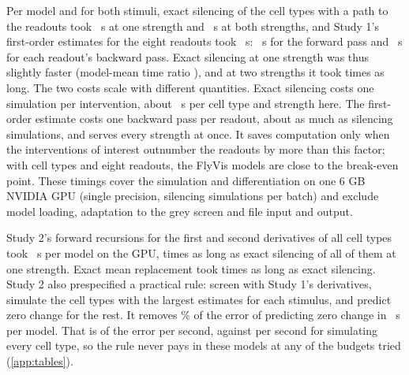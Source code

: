 Per model and for both stimuli, exact silencing of the \SimulatedTypes{} cell types with a path to the readouts took \TimeExactFull{}~s at one strength and \TimeExactBoth{}~s at both strengths, and Study 1's first-order estimates for the eight readouts took \TimeGradient{}~s: \TimeForward{}~s for the forward pass and \TimeBackwardEach{}~s for each readout's backward pass. Exact silencing at one strength was thus slightly faster (model-mean time ratio \TimeRatioFull{}), and at two strengths it took \TimeRatioBoth{} times as long. The two costs scale with different quantities. Exact silencing costs one simulation per intervention, about \TimePerType{}~s per cell type and strength here. The first-order estimate costs one backward pass per readout, about as much as \BackwardOverType{} silencing simulations, and serves every strength at once. It saves computation only when the interventions of interest outnumber the readouts by more than this factor; with \SimulatedTypes{} cell types and eight readouts, the FlyVis models are close to the break-even point. These timings cover the simulation and differentiation on one 6 GB NVIDIA GPU (single precision, \BatchSize{} silencing simulations per batch) and exclude model loading, adaptation to the grey screen and file input and output.

Study 2's forward recursions for the first and second derivatives of all \NSimTypes{} cell types took \TimeTangentsZero{}~s per model on the GPU, \TimeRatioTangents{} times as long as exact silencing of all of them at one strength. Exact mean replacement took \TimeRatioExactMean{} times as long as exact silencing. Study 2 also prespecified a practical rule: screen with Study 1's derivatives, simulate the \FlagBudgetPrimary{} cell types with the largest estimates for each stimulus, and predict zero change for the rest. It removes \FlagRecTenZero\% of the error of predicting zero change in \FlagSecTenZero{}~s per model. That is \FlagPerSecTenZero{} of the error per second, against \ExhaustivePerSec{} per second for simulating every cell type, so the rule never pays in these models at any of the budgets tried (\cref{app:tables}).
